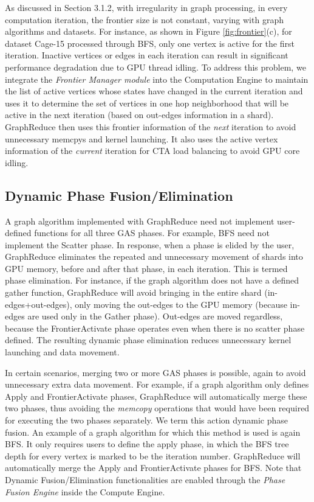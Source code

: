 As discussed in Section 3.1.2, with irregularity in graph processing, in every computation iteration, the frontier size 
is not constant, varying with graph algorithms and datasets. For instance, as shown in Figure \ref{fig:frontier}(c), 
for dataset Cage-15 processed through BFS, only one vertex is active for the first iteration. Inactive vertices or 
edges in each iteration can result in significant performance degradation due to GPU thread idling. 
To address this problem, we integrate the \textit{Frontier Manager module} into the Computation Engine to maintain the list of active vertices whose states have changed in the current iteration and uses it to determine the set of vertices in one hop neighborhood that will be active in the next iteration (based on out-edges information in a shard). GraphReduce then uses this frontier information of the \textit{next} iteration to avoid unnecessary memcpys and kernel launching. It also uses the active vertex information of the \textit{current} iteration for CTA load balancing to avoid GPU core idling.

 



\subsection{Dynamic Phase Fusion/Elimination}
\label{opt3}


A graph algorithm implemented with GraphReduce need not implement user-defined functions for all three GAS phases. 
For example, BFS need not implement the Scatter phase. In response, when a phase is elided by the user, 
GraphReduce eliminates the repeated and unnecessary movement of shards into GPU memory, before and after that phase, 
in each iteration. This is termed phase elimination. For instance, if the graph algorithm does not have a defined 
gather function, GraphReduce will avoid bringing in the entire shard (in-edges+out-edges), only moving the out-edges 
to the GPU memory (because in-edges are used only in the Gather phase). Out-edges are moved regardless, because
the FrontierActivate phase operates even when there is no scatter phase defined. The resulting dynamic phase elimination 
reduces unnecessary kernel launching and data movement. 

In certain scenarios, merging two or more GAS phases is possible, again to avoid unnecessary extra data movement. 
For example, if a graph algorithm only defines Apply and FrontierActivate phases, GraphReduce will automatically merge 
these two phases, thus avoiding the \textit{memcopy} operations that would have been required for executing the two phases 
separately. We term this action dynamic phase fusion. An example of a graph algorithm for which this method is used
is again BFS. It only requires users to define the apply phase, in which the BFS tree depth for every vertex is marked 
to be the iteration number. GraphReduce will automatically merge the Apply and FrontierActivate phases for BFS. Note that Dynamic Fusion/Elimination functionalities are enabled
through the \textit{Phase Fusion Engine} inside the Compute Engine.




